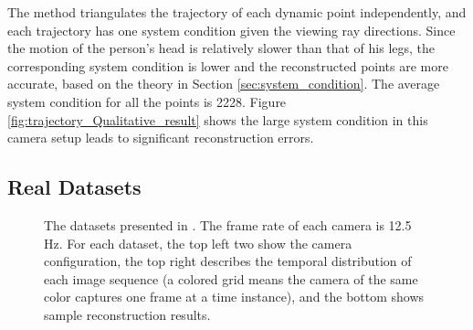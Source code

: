 The method triangulates the trajectory of each dynamic point independently, and 
each trajectory has one system condition given the viewing ray directions. 
Since the motion of the person's head is relatively slower than that of his legs, the corresponding system condition is lower and the reconstructed points are more accurate, based on the theory in Section \ref{sec:system_condition}. 
The average system condition for all the points is 2228. 
Figure \ref{fig:trajectory_Qualitative_result} shows the large system condition in this camera setup leads to significant reconstruction errors.

\subsection{Real Datasets}
\begin{figure}
\centering
{}

\caption[Example output of two real datasets.]{The datasets presented in \cite{ballan2010unstructured}. The frame rate of each camera is 12.5 Hz. For each dataset, the top left two show the camera configuration, the top right describes the temporal distribution of each image sequence (a colored grid means the camera of the same color captures one frame at a time instance), and the bottom shows sample reconstruction results. }
\label{fig:onlinedata}
\end{figure}

